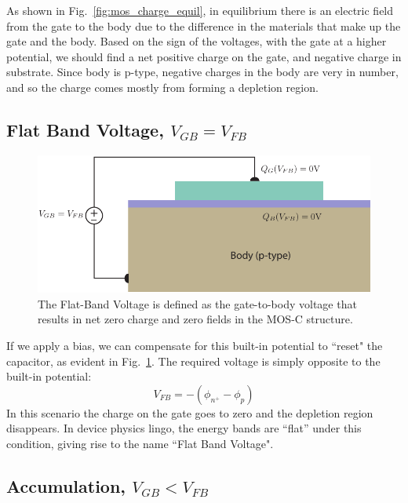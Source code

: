 As shown in Fig.~\ref{fig:mos_charge_equil}, in equilibrium there is an electric field from the gate to the body due to the difference in the materials that make up the gate and the body.  Based on the sign of the voltages, with the gate at a higher potential, we should find a net positive charge on the gate, and negative charge in substrate.   Since body is p-type, negative charges in the body are very in number, and so the charge comes mostly from forming a depletion region.
 


\subsection{Flat Band Voltage, $V_{GB} = V_{FB}$}

\begin{figure}[tbh]
\begin{center}
\includegraphics[width=.75\columnwidth]{mos_cap_flatband}
\end{center}
\caption{The Flat-Band Voltage is defined as the gate-to-body voltage that results in net zero charge and zero fields in the MOS-C structure.    } \label{fig:mos_flatband}
\end{figure}

If we apply a bias, we can compensate for this built-in potential to ``reset" the capacitor, as evident in Fig.~\ref{fig:mos_flatband}.  The required voltage is simply opposite to the built-in potential:
%
\begin{equation}
	{V_{FB}} =  - ({\phi _{{n^ + }}} - {\phi _p})
\end{equation}
%
In this scenario the charge on the gate goes to zero and the depletion region disappears.
 In device physics lingo, the energy bands are “flat” under this condition, giving rise to the name ``Flat Band Voltage".
 

\subsection{Accumulation, $V_{GB} < V_{FB}$}

